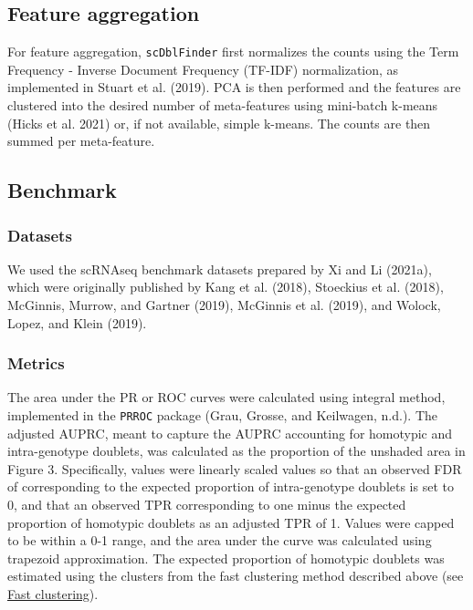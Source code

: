 \documentclass[10pt,a4paper,twocolumn]{article}
\begin{document}
\subsection{Feature aggregation}

For feature aggregation, \texttt{scDblFinder} first normalizes the counts using the Term Frequency - Inverse Document Frequency (TF-IDF) normalization, as implemented in Stuart et al. (2019). PCA is then performed and the features are clustered into the desired number of meta-features using mini-batch k-means (Hicks et al. 2021) or, if not available, simple k-means. The counts are then summed per meta-feature.

\subsection{Benchmark}

\subsubsection{Datasets}

We used the scRNAseq benchmark datasets prepared by Xi and Li (2021a), which were originally published by Kang et al. (2018), Stoeckius et al. (2018), McGinnis, Murrow, and Gartner (2019), McGinnis et al. (2019), and Wolock, Lopez, and Klein (2019).

\subsubsection{Metrics}

The area under the PR or ROC curves were calculated using integral method, implemented in the \texttt{PRROC} package (Grau, Grosse, and Keilwagen, n.d.). The adjusted AUPRC, meant to capture the AUPRC accounting for homotypic and intra-genotype doublets, was calculated as the proportion of the unshaded area in Figure 3. Specifically, values were linearly scaled values so that an observed FDR of corresponding to the expected proportion of intra-genotype doublets is set to 0, and that an observed TPR corresponding to one minus the expected proportion of homotypic doublets as an adjusted TPR of 1. Values were capped to be within a 0-1 range, and the area under the curve was calculated using trapezoid approximation. The expected proportion of homotypic doublets was estimated using the clusters from the fast clustering method described above (see \protect\hyperlink{fast-clustering}{Fast clustering}).
\end{document}
